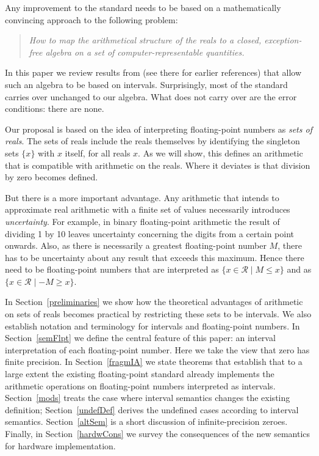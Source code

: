 \documentclass[11pt]{article}
\newcommand{\R}{\mathcal{R}}
\begin{document}
Any improvement to the standard needs to be based on a mathematically
convincing approach to the following problem:
\begin{quote}
\emph{
How to map the
arithmetical structure of the reals to a closed, exception-free algebra
on a set of computer-representable quantities.
}
\end{quote}
In this paper we review results from \cite{hckvnmdn01} (see there for
earlier references) that allow such an algebra to be based on
intervals.  Surprisingly, most of the standard carries over unchanged
to our algebra. What does not carry over are the error conditions:
there are none.

Our proposal is based on the idea of interpreting floating-point
numbers as \emph{sets of reals}.  The sets of reals include the reals
themselves by identifying the singleton sets $\{x\}$ with $x$ itself,
for all reals $x$.  As we will show, this defines an arithmetic that
is compatible with arithmetic on the reals.  Where it deviates is that
division by zero becomes defined.

But there is a more important advantage.
Any arithmetic that intends to approximate real arithmetic with a
finite set of values necessarily introduces \emph{uncertainty}.
For example, in binary floating-point arithmetic the result of dividing 1 by 10
leaves uncertainty concerning the digits from a certain point onwards.
Also, as there is necessarily a greatest floating-point number $M$,
there has to be uncertainty about any result that exceeds this
maximum.
Hence there need to be floating-point numbers that are interpreted as
$\{ x \in \R \mid M \leq x \}$
and as
$\{ x \in \R \mid -M \geq x \}$.

In Section~\ref{preliminaries} we show how the theoretical advantages
of arithmetic on sets of reals becomes practical by restricting these
sets to be intervals. We also establish notation and terminology for
intervals and floating-point numbers.  In Section~\ref{semFlpt} we
define the central feature of this paper: an interval interpretation
of each floating-point number.  Here we take the view that zero has
finite precision.  In Section~\ref{fragmIA} we state theorems that
establish that to a large extent the existing floating-point standard
already implements the arithmetic operations on floating-point numbers
interpreted as intervals.  Section~\ref{mods} treats the case where
interval semantics changes the existing definition;
Section~\ref{undefDef} derives the undefined cases according to
interval semantics.  Section~\ref{altSem} is a short discussion of
infinite-precision zeroes.  Finally, in Section~\ref{hardwCons} we
survey the consequences of the new semantics for hardware
implementation.
\end{document}
